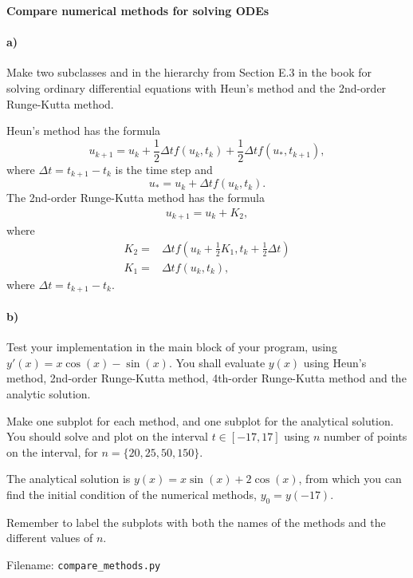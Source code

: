 \begin{Problem}{\textbf{Compare numerical methods for solving ODEs}}
\paragraph{a)}Make two subclasses  and  in the  hierarchy from Section E.3 in the book for solving ordinary differential equations with Heun's method and the 2nd-order Runge-Kutta method.  

Heun's method has the formula
\begin{equation*}
    u_{k+1} = u_k + \frac{1}{2}\Delta t f(u_k,t_k) + \frac{1}{2}\Delta t f(u_*, t_{k+1}), 
\end{equation*}
where  $\Delta t = t_{k+1} - t_k$ is the time step and    
\begin{equation*}
     u_* = u_k + \Delta t f(u_k, t_k) .
\end{equation*}
The 2nd-order Runge-Kutta method has the formula
\begin{align*}
    u_{k+1} = u_k + K_2,
\end{align*}
where
\begin{align*}
    K_2 =& \Delta t f(u_k + \frac{1}{2}K_1, t_k + \frac{1}{2}\Delta t) \\
     K_1 =& \Delta t f(u_k,t_k) ,
\end{align*}
where $\Delta t = t_{k+1} - t_k$.

\paragraph{b)}
Test your implementation in the main block of your program, using $y'(x) = x\cos(x)-\sin(x)$. You shall evaluate $y(x)$ using Heun's method, 2nd-order Runge-Kutta method, 4th-order Runge-Kutta method and the analytic solution. 


Make one subplot for each method, and one subplot for the analytical solution. You should solve and plot on the interval $t \in [-17, 17]$ using $n$ number of points on the interval, for $n = \{20, 25,50,150\}$. 

The analytical solution is $y(x) = x\sin(x)+2\cos(x)$, from which you can find the initial condition of the numerical methods, $y_0 = y(-17)$. 

Remember to label the subplots with both the names of the methods and the different values of $n$.


Filename: \texttt{compare\_methods.py}
\end{Problem}

